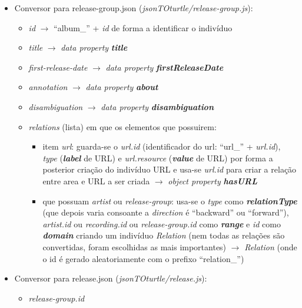 \documentclass{article}
\begin{document}
\begin{itemize}
\begin{itemize}
\begin{itemize}
                \end{itemize}
        \end{itemize}
    \item Conversor para release-group.json (\textit{jsonTOturtle/release-group.js}):
        \begin{itemize}
            \item \textit{id} $\to$ ``album\_'' + \textit{id} de forma a identificar o indivíduo
            \item \textit{title} $\to$ \textit{data property} \textit{\textbf{title}}
            \item \textit{first-release-date} $\to$ \textit{data property} \textit{\textbf{firstReleaseDate}}
            \item \textit{annotation} $\to$ \textit{data property} \textit{\textbf{about}}
            \item \textit{disambiguation} $\to$ \textit{data property} \textit{\textbf{disambiguation}}
            \item \textit{relations} (lista) em que os elementos que possuirem:
                \begin{itemize}
                    \item item \textit{url}: guarda-se o \textit{url.id} (identificador do url: ``url\_'' + \textit{url.id}), \textit{type} (\textit{\textbf{label}} de URL) e \textit{url.resource} (\textit{\textbf{value}} de URL) por forma a posterior criação do indivíduo URL e usa-se \textit{url.id} para criar a relação entre area e URL a ser criada $\to$ \textit{object property} \textit{\textbf{hasURL}}
                    \item que possuam \textit{artist} ou \textit{release-group}: usa-se o \textit{type} como \textit{\textbf{relationType}} (que depois varia consoante a \textit{direction} é ``backward'' ou ``forward''), \textit{artist.id} ou \textit{recording.id} ou \textit{release-group.id} como \textit{\textbf{range}} e \textit{id} como \textit{\textbf{domain}} criando um indivíduo \textit{Relation} (nem todas as relações são convertidas, foram escolhidas as mais importantes) $\to$ \textit{Relation} (onde o id é gerado aleatoriamente com o prefixo ``relation\_'')
                \end{itemize}
        \end{itemize}
    \item Conversor para release.json (\textit{jsonTOturtle/release.js}):
        \begin{itemize}
            \item \textit{release-group.id}

\end{itemize}
\end{itemize}
\end{document}

